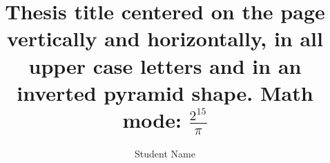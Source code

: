 \documentclass[12pt]{mines-thesis}
\begin{document}
	\autotitle %
	\title{Thesis title centered on the page vertically and horizontally, in all upper case letters
		and in an inverted pyramid shape. Math mode: $\frac{2^{15}}{\pi}$
	}
	
	
	
	\author{Student Name}  %
	
	
\end{document}
